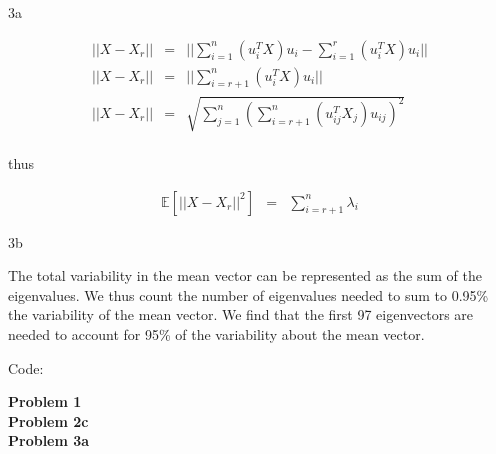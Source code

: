 \documentclass{article}
\begin{document}
\begin{homeworkProblem}

    \begin{homeworkSection}{3a}

        \begin{eqnarray*}
            ||X - X_r|| &=& ||\sum_{i=1}^n (u_i^T X)u_i - 
                            \sum_{i=1}^r (u_i^T X)u_i|| \\
            ||X - X_r|| &=& ||\sum_{i=r+1}^n (u_i^T X)u_i|| \\
                            ||X - X_r|| &=& \sqrt{\sum_{j=1}^n
                            \left(\sum_{i=r+1}^n (u_{ij}^T
                        X_j)u_{ij}\right)^2} \\
        \end{eqnarray*}

        \noindent thus

        \begin{eqnarray*}
            \mathbb{E}[||X - X_r||^2] &=& \sum_{i=r+1}^n \lambda_i
        \end{eqnarray*}
        
    \end{homeworkSection}

    \begin{homeworkSection}{3b}

        The total variability in the mean vector can be represented as the sum
        of the eigenvalues. We thus count the number of eigenvalues needed to
        sum to 0.95\% the variability of the mean vector. We find that the
        first 97 eigenvectors are needed to account for 95\% of the variability
        about the mean vector.

    \end{homeworkSection}

\end{homeworkProblem}
\clearpage

\clearpage
{\huge Code:\\}

{\large \bf Problem 1} \\
 

{\large \bf Problem 2c} \\
 

{\large \bf Problem 3a} \\
 
\end{document}
